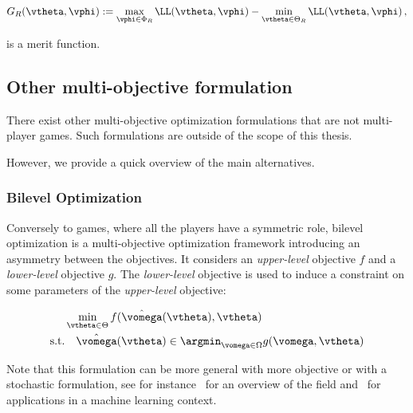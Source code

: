 \begin{equation}
G_R(\vtheta,\vphi) := \max_{\vphi \in \Phi_R} \LL(\vtheta,\vphi) - \min_{\vtheta \in \Theta_R}\LL(\vtheta,\vphi)\,,
\end{equation}

is a merit function.













\subsection{Other multi-objective formulation}

There exist other multi-objective optimization formulations that are not multi-player games. Such formulations are outside of the scope of this thesis. 

However, we provide a quick overview of the main alternatives. 

\subsubsection{Bilevel Optimization}

\label{subsub:bilevel}

Conversely to games, where all the players have a symmetric role, bilevel optimization is a multi-objective optimization framework introducing an asymmetry between the objectives. It considers an \emph{upper-level} objective $f$ and a \emph{lower-level} objective $g$. The \emph{lower-level} objective is used to induce a constraint on some parameters of the \emph{upper-level} objective: 

\begin{equation}
\begin{aligned}
&\min_{\vtheta \in \Theta} f(\hat{\vomega}(\vtheta),\vtheta) \\
\text{s.t.} &\quad \hat{\vomega}(\vtheta) \in \argmin_{\vomega \in \Omega} g(\vomega,\vtheta)
\end{aligned}
\end{equation}

Note that this formulation can be more general with more objective or with a stochastic formulation, see for instance~\citet{colson2007overview,bard2013practical} for an overview of the field and~\citet{pedregosa2016hyperparameter,gould2016differentiating,shaban2019truncated} for applications in a machine learning context.




